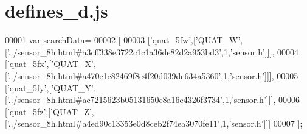 \hypertarget{defines__d_8js_source}{}\section{defines\+\_\+d.\+js}
\label{defines__d_8js_source}

\begin{DoxyCode}
\hypertarget{defines__d_8js_source.tex_l00001}{}\hyperlink{defines__d_8js_ad01a7523f103d6242ef9b0451861231e}{00001} var \hyperlink{defines__d_8js_ad01a7523f103d6242ef9b0451861231e}{searchData}=
00002 [
00003   [\textcolor{stringliteral}{'quat\_5fw'},[\textcolor{stringliteral}{'QUAT\_W'},[\textcolor{stringliteral}{'../sensor\_8h.html#a3cff338e3722c1c1a36de82d2a953bd3'},1,\textcolor{stringliteral}{'sensor.h'}]]],
00004   [\textcolor{stringliteral}{'quat\_5fx'},[\textcolor{stringliteral}{'QUAT\_X'},[\textcolor{stringliteral}{'../sensor\_8h.html#a470e1c82469f8e4f20d039de634a5360'},1,\textcolor{stringliteral}{'sensor.h'}]]],
00005   [\textcolor{stringliteral}{'quat\_5fy'},[\textcolor{stringliteral}{'QUAT\_Y'},[\textcolor{stringliteral}{'../sensor\_8h.html#ac7215623b05131650c8a16e4326f3734'},1,\textcolor{stringliteral}{'sensor.h'}]]],
00006   [\textcolor{stringliteral}{'quat\_5fz'},[\textcolor{stringliteral}{'QUAT\_Z'},[\textcolor{stringliteral}{'../sensor\_8h.html#a4ed90c13353e0d8ceb2f74ea3070fe11'},1,\textcolor{stringliteral}{'sensor.h'}]]]
00007 ];
\end{DoxyCode}
